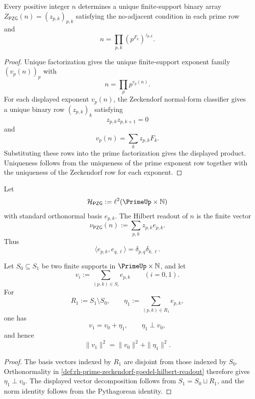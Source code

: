 \begin{theorem}
\label{thm:rh-prime-zeckendorf-goedel-uniqueness}
Every positive integer $n$ determines a unique finite-support binary
array $Z_{\mathsf{PZG}}(n)=(z_{p,k})_{p,k}$ satisfying the no-adjacent
condition in each prime row and
$$
n
=
\prod_{p,k}\left(p^{F_k}\right)^{z_{p,k}}.
$$
\end{theorem}

\begin{proof}
Unique factorization gives the unique finite-support exponent family
$(v_p(n))_p$ with
$$
n=\prod_p p^{v_p(n)}.
$$
For each displayed exponent $v_p(n)$, the Zeckendorf normal-form
classifier gives a unique binary row $(z_{p,k})_k$ satisfying
$$
z_{p,k}z_{p,k+1}=0
$$
and
$$
v_p(n)=\sum_k z_{p,k}F_k.
$$
Substituting these rows into the prime factorization gives the displayed
product. Uniqueness follows from the uniqueness of the prime exponent
row together with the uniqueness of the Zeckendorf row for each
exponent.
\end{proof}

\begin{definition}
\label{def:rh-prime-zeckendorf-goedel-hilbert-readout}
Let
$$
\mathcal H_{\mathsf{PZG}}
:=
\ell^2(\PrimeUp\times\mathbb N)
$$
with standard orthonormal basis $e_{p,k}$. The Hilbert readout of $n$ is
the finite vector
$$
\nu_{\mathsf{PZG}}(n)
:=
\sum_{p,k} z_{p,k}e_{p,k}.
$$
Thus
$$
\langle e_{p,k},e_{q,\ell}\rangle
=
\delta_{p,q}\delta_{k,\ell}.
$$
\end{definition}

\begin{theorem}
\label{thm:rh-register-extensions-orthogonal-innovations}
Let $S_0\subseteq S_1$ be two finite supports in
$\PrimeUp\times\mathbb N$, and let
$$
v_i:=\sum_{(p,k)\in S_i}e_{p,k}
\qquad (i=0,1).
$$
For
$$
R_1:=S_1\setminus S_0,
\qquad
\eta_1:=\sum_{(p,k)\in R_1}e_{p,k},
$$
one has
$$
v_1=v_0+\eta_1,
\qquad
\eta_1\perp v_0,
$$
and hence
$$
\|v_1\|^2=\|v_0\|^2+\|\eta_1\|^2.
$$
\end{theorem}

\begin{proof}
The basis vectors indexed by $R_1$ are disjoint from those indexed by
$S_0$. Orthonormality in
\autoref{def:rh-prime-zeckendorf-goedel-hilbert-readout} therefore gives
$\eta_1\perp v_0$. The displayed vector decomposition follows from
$S_1=S_0\sqcup R_1$, and the norm identity follows from the
Pythagorean identity.
\end{proof}

